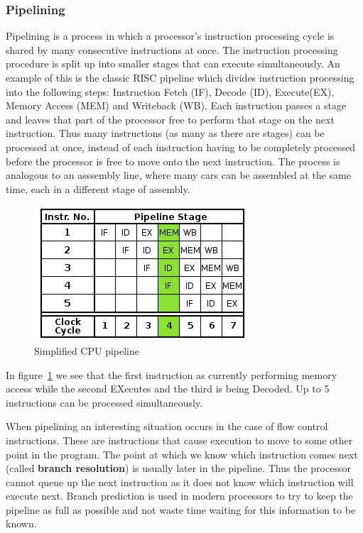 \documentclass[english,a4paper]{article}
\begin{document}
\subsubsection{Pipelining}

Pipelining is a process in which a processor's instruction processing
cycle is shared by many consecutive instructions at once. The
instruction processing procedure is split up into smaller stages that
can execute simultaneously. An example of this is the classic RISC
pipeline which divides instruction processing into the following
steps: Instruction Fetch (IF), Decode (ID), Execute(EX), Memory Access
(MEM) and Writeback (WB). Each instruction passes a stage and leaves
that part of the processor free to perform that stage on the next
instruction. Thus many instructions (as many as there are stages) can
be processed at once, instead of each instruction having to be
completely processed before the processor is free to move onto the
next instruction. The process is analogous to an asssembly line, where
many cars can be assembled at the same time, each in a different stage
of assembly.

\begin{figure}[tph]
  \centering
  \includegraphics[scale=0.5]{pipeline}
  \caption{Simplified CPU pipeline}
  \label{fig:pipeline}
\end{figure}

In figure~\ref{fig:pipeline} we see that the first instruction as
currently performing memory access while the second EXecutes and the
third is being Decoded. Up to 5 instructions can be processed
simultaneously.

When pipelining an interesting situation occurs in the case of flow
control instructions. These are instructions that cause execution to
move to some other point in the program. The point at which we know
which instruction comes next (called \textbf{branch resolution}) is
usually later in the pipeline. Thus the processor cannot queue up the
next instruction as it does not know which instruction will execute
next. Branch prediction is used in modern processors to try to keep
the pipeline as full as possible and not waste time waiting for this
information to be known.
\end{document}
